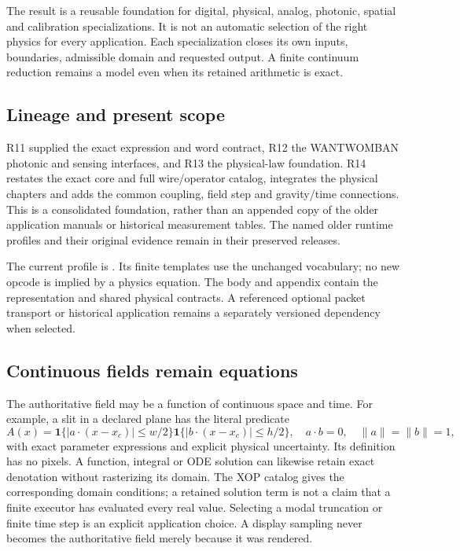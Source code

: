 The result is a reusable foundation for digital, physical, analog, photonic,
spatial and calibration specializations. It is not an automatic selection of
the right physics for every application. Each specialization closes its own
inputs, boundaries, admissible domain and requested output. A finite continuum
reduction remains a model even when its retained arithmetic is exact.

\subsection*{Lineage and present scope}
R11 supplied the exact expression and word contract, R12 the WANTWOMBAN
photonic and sensing interfaces, and R13 the physical-law foundation. R14
restates the exact core and full wire/operator catalog, integrates the physical
chapters and adds the common coupling, field step and gravity/time connections.
This is a consolidated foundation, rather than an appended copy of the older
application manuals or historical measurement tables. The named older runtime
profiles and their original evidence remain in their preserved releases.

The current profile is . Its finite templates use
the unchanged  vocabulary; no new opcode is implied by a physics
equation. The body and appendix contain the representation and shared physical
contracts. A referenced optional packet transport or historical application
remains a separately versioned dependency when selected.

\subsection*{Continuous fields remain equations}
The authoritative field may be a function of continuous space and time.
For example, a slit in a declared plane has the literal predicate
\[
 A(x)=\boldsymbol1\{|a\cdot(x-x_c)|\le w/2\}
      \boldsymbol1\{|b\cdot(x-x_c)|\le h/2\},
 \quad a\cdot b=0,\quad\|a\|=\|b\|=1,
\]
with exact parameter expressions and explicit physical uncertainty. Its
definition has no pixels. A function, integral or ODE solution can likewise
retain exact denotation without rasterizing its domain. The XOP catalog gives
the corresponding domain conditions; a retained solution term is not a claim
that a finite executor has evaluated every real value. Selecting a modal
truncation or finite time step is an explicit application choice. A display
sampling never becomes the authoritative field merely because it was rendered.

